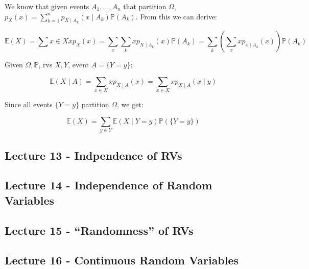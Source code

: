 \documentclass{article}
\begin{document}
We know that given events $A_1, \dots, A_n$ that partition $\Omega$,
$p_X(x) = \sum_{k=1}^n p_{X\mid A_k} (x\mid A_k)
\mathbb{P}(A_k)$. From this we can derive:

\[
  \mathbb{E}(X) = \sum{x\in X} xp_X(x) = \sum_x \sum_k xp_{X\mid A_k}
  (x) \mathbb{P}(A_k) = \sum_k(\sum_x xp_{x\mid A_k}(x))
  \mathbb{P}(A_k)
\]

Given $\Omega, \mathbb{P}$, rvs $X,Y$, event $A = \{Y=y\}$:

\[
  \mathbb{E}(X\mid A) = \sum_{x\in X} xp_{X\mid A}(x) = \sum_{x\in X}
  xp_{X\mid A}(x \mid y)
\]

Since all events $\{Y = y\}$ partition $\Omega$, we get:

\[
  \mathbb{E}(X) = \sum_{y\in Y} \mathbb{E}(X \mid Y=y)
  \mathbb{P}(\{Y=y\})
\]


\subsection{Lecture 13 - Indpendence of RVs}



\subsection{Lecture 14 - Independence of Random Variables}


\subsection{Lecture 15 - ``Randomness'' of RVs}


\subsection{Lecture 16 - Continuous Random Variables}
\end{document}
